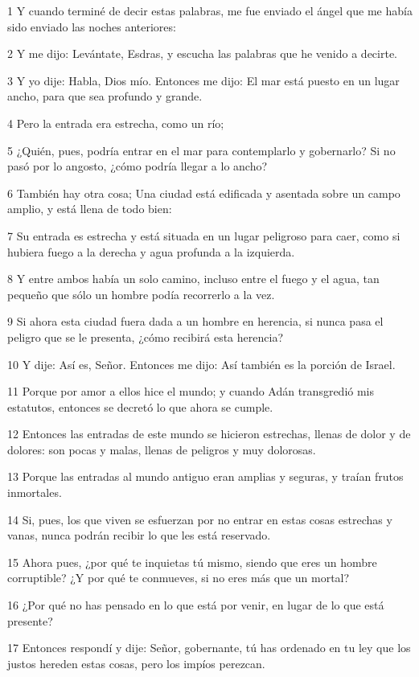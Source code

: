 \par 1 Y cuando terminé de decir estas palabras, me fue enviado el ángel que me había sido enviado las noches anteriores:
\par 2 Y me dijo: Levántate, Esdras, y escucha las palabras que he venido a decirte.
\par 3 Y yo dije: Habla, Dios mío. Entonces me dijo: El mar está puesto en un lugar ancho, para que sea profundo y grande.
\par 4 Pero la entrada era estrecha, como un río;
\par 5 ¿Quién, pues, podría entrar en el mar para contemplarlo y gobernarlo? Si no pasó por lo angosto, ¿cómo podría llegar a lo ancho?
\par 6 También hay otra cosa; Una ciudad está edificada y asentada sobre un campo amplio, y está llena de todo bien:
\par 7 Su entrada es estrecha y está situada en un lugar peligroso para caer, como si hubiera fuego a la derecha y agua profunda a la izquierda.
\par 8 Y entre ambos había un solo camino, incluso entre el fuego y el agua, tan pequeño que sólo un hombre podía recorrerlo a la vez.
\par 9 Si ahora esta ciudad fuera dada a un hombre en herencia, si nunca pasa el peligro que se le presenta, ¿cómo recibirá esta herencia?
\par 10 Y dije: Así es, Señor. Entonces me dijo: Así también es la porción de Israel.
\par 11 Porque por amor a ellos hice el mundo; y cuando Adán transgredió mis estatutos, entonces se decretó lo que ahora se cumple.
\par 12 Entonces las entradas de este mundo se hicieron estrechas, llenas de dolor y de dolores: son pocas y malas, llenas de peligros y muy dolorosas.
\par 13 Porque las entradas al mundo antiguo eran amplias y seguras, y traían frutos inmortales.
\par 14 Si, pues, los que viven se esfuerzan por no entrar en estas cosas estrechas y vanas, nunca podrán recibir lo que les está reservado.
\par 15 Ahora pues, ¿por qué te inquietas tú mismo, siendo que eres un hombre corruptible? ¿Y por qué te conmueves, si no eres más que un mortal?
\par 16 ¿Por qué no has pensado en lo que está por venir, en lugar de lo que está presente?
\par 17 Entonces respondí y dije: Señor, gobernante, tú has ordenado en tu ley que los justos hereden estas cosas, pero los impíos perezcan.
